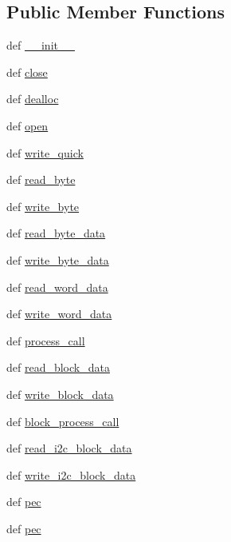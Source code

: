 \subsection*{Public Member Functions}
\begin{DoxyCompactItemize}
\item 
def \hyperlink{classsmbus_1_1smbus_1_1SMBus_a5570926783b8c03126ee1bb16db5a809}{\+\_\+\+\_\+init\+\_\+\+\_\+}
\item 
def \hyperlink{classsmbus_1_1smbus_1_1SMBus_a4d05c97f23b503dd8734bc9b12e3967b}{close}
\item 
def \hyperlink{classsmbus_1_1smbus_1_1SMBus_a4741cfb528b084eba05b559e29cb02e7}{dealloc}
\item 
def \hyperlink{classsmbus_1_1smbus_1_1SMBus_a9d167b95223ea7f9a7c84ceb46ce7917}{open}
\item 
def \hyperlink{classsmbus_1_1smbus_1_1SMBus_a4f6f5835f5f07483eaf5fc821132a814}{write\+\_\+quick}
\item 
def \hyperlink{classsmbus_1_1smbus_1_1SMBus_a52180db9a2eb41350fb9af103c7a84f5}{read\+\_\+byte}
\item 
def \hyperlink{classsmbus_1_1smbus_1_1SMBus_a3896663ab7d169ddba0b4169fc9623c9}{write\+\_\+byte}
\item 
def \hyperlink{classsmbus_1_1smbus_1_1SMBus_a264af016c26e51e09c04678e3e182050}{read\+\_\+byte\+\_\+data}
\item 
def \hyperlink{classsmbus_1_1smbus_1_1SMBus_ae9f8fea707563383266db196982f4d27}{write\+\_\+byte\+\_\+data}
\item 
def \hyperlink{classsmbus_1_1smbus_1_1SMBus_aabcc4cd79c3bca4aaf1581b4ecbb66fc}{read\+\_\+word\+\_\+data}
\item 
def \hyperlink{classsmbus_1_1smbus_1_1SMBus_a390888805a9185cf0850bb4200c9e489}{write\+\_\+word\+\_\+data}
\item 
def \hyperlink{classsmbus_1_1smbus_1_1SMBus_a9f027f80d356ed5126d0897017f10e66}{process\+\_\+call}
\item 
def \hyperlink{classsmbus_1_1smbus_1_1SMBus_aea9a892cca12e95205acf4bc4cb925a5}{read\+\_\+block\+\_\+data}
\item 
def \hyperlink{classsmbus_1_1smbus_1_1SMBus_a7500be8b15ef86ec2e0424832dc44854}{write\+\_\+block\+\_\+data}
\item 
def \hyperlink{classsmbus_1_1smbus_1_1SMBus_a3cd1939b129e3fd40e629ce753bd5f9d}{block\+\_\+process\+\_\+call}
\item 
def \hyperlink{classsmbus_1_1smbus_1_1SMBus_aff8dbb4d2ad977c63dc5285423df6652}{read\+\_\+i2c\+\_\+block\+\_\+data}
\item 
def \hyperlink{classsmbus_1_1smbus_1_1SMBus_a5f47b6f24f1b8f2a61473c57d667e8f5}{write\+\_\+i2c\+\_\+block\+\_\+data}
\item 
def \hyperlink{classsmbus_1_1smbus_1_1SMBus_a0c4d579aebe61aa6bfe1fd4147d7d7f5}{pec}
\item 
def \hyperlink{classsmbus_1_1smbus_1_1SMBus_a0c4d579aebe61aa6bfe1fd4147d7d7f5}{pec}
\end{DoxyCompactItemize}


